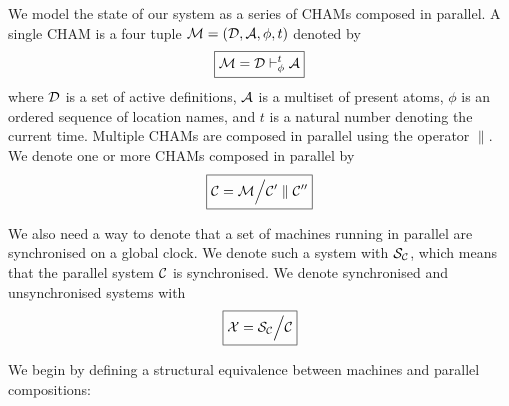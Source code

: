 We model the state of our system as a series of CHAMs composed in parallel. A
single CHAM is a four tuple $\mathcal{M} = (\mathcal{D}, \mathcal{A}, \phi, t)$ denoted by
\begin{equation*}
 \boxed{\mathcal{M} = \mathcal{D} \vdash^{t}_{\phi} \mathcal{A}}
\end{equation*}
where $\mathcal{D}$ is a set of active definitions, $\mathcal{A}$ is a multiset
of present atoms, $\phi$ is an ordered sequence of location names, and $t$ is
a natural number denoting the current time. Multiple CHAMs are composed in
parallel using the operator $\parallel$. We denote one or more CHAMs composed
in parallel by
\begin{equation*}
 \boxed{\mathcal{C} = \mathcal{M} \Big\slash \mathcal{C}'\parallel\mathcal{C}''}
\end{equation*}

We also need a way to denote that a set of machines running in parallel are
synchronised on a global clock. We denote such a system with $\mathcal{S}_{\mathcal{C}}$, which
means that the parallel system $\mathcal{C}$ is synchronised. We denote synchronised and
unsynchronised systems with
\begin{equation*}
 \boxed{\mathcal{X} = \mathcal{S}_{\mathcal{C}} \Big\slash \mathcal{C}}
\end{equation*}

We begin by defining a structural equivalence between machines and parallel
compositions:
\begin{figure}[!h]
\end{figure}

